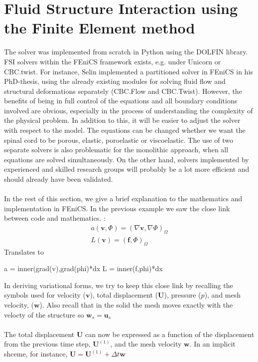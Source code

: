 \section{Fluid Structure Interaction using the Finite Element method}
The solver was implemented from scratch in Python using the DOLFIN library. FSI solvers within the FEniCS framework exists, e.g. under Unicorn or CBC.twist. For instance, Selin \cite{Seli11} implemented a partitioned solver in FEniCS in his PhD-thesis, using the already existing modules for solving fluid flow and structural deformations separately (CBC.Flow and CBC.Twist). However, the benefits of being in full control of the equations and all boundary conditions involved are obvious, especially in the process of understanding the complexity of the physical problem. In addition to this, it will be easier to adjust the solver with respect to the model. The equations can be changed whether we want the spinal cord to be porous, elastic, poroelastic or viscoelastic. The use of two separate solvers is also problematic for the monolithic approach, when all equations are solved simultaneously. On the other hand, solvers implemented by experienced and skilled research groups will probably be a lot more efficient and should already have been validated. 
\\
\\
In the rest of this section, we give a brief explanation to the mathematics and implementation in FEniCS. In the previous example we saw the close link between code and mathematics. :
\begin{align*}
a(\mathbf{v},\Phi) = (\nabla \mathbf{v}, \nabla \Phi)_\Omega \\
L(\mathbf{v}) = (\mathbf{f},\Phi)_\Omega
\end{align*}
Translates to
\begin{center}
\begin{cverbatim}
a = inner(grad(v),grad(phi)*dx
L = inner(f,phi)*dx
\end{cverbatim}
\end{center}
In deriving variational forms, we try to keep this close link by recalling the symbols used for velocity ($\mathbf{v}$), total displacement ($\mathbf{U}$), pressure ($p$), and mesh velocity, ($\mathbf{w}$). Also recall that in the solid the mesh moves exactly with the velocty of the structure so $\mathbf{w}_s = \mathbf{u}_s$
\\
\\
The total displacement $\mathbf{U}$ can now be expressed as a function of the displacement from the previous time step, $\mathbf{U}^{(1)}$, and the mesh velocity $\mathbf{w}$. In an implicit shceme, for instance, $\mathbf{U} = \mathbf{U}^{(1)} + \Delta t\mathbf{w}$
